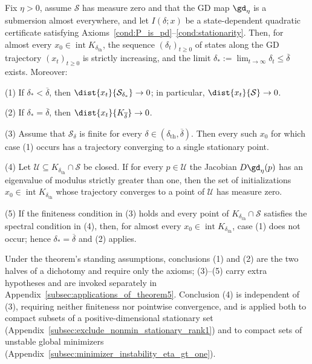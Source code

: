 \documentclass{article}
\begin{document}
\begin{theorem}\label{thm:abstract_state_dependent_convergence}
Fix $\eta>0$, assume $\mathcal S$ has measure zero and that the GD map
$\gd_\eta$ is a submersion almost everywhere, and let $I(\delta;x)$ be a
state-dependent quadratic certificate satisfying
Axioms~\ref{cond:P_is_pd}--\ref{cond:stationarity}.
Then, for almost every $x_0\in\operatorname{int}K_{\delta_{\mathrm{th}}}$,
the sequence $(\delta_t)_{t\ge0}$ of states along the GD trajectory $(x_t)_{t\ge0}$
is strictly increasing, and the limit
$\delta_\ast:=\lim_{t\to\infty}\delta_t\le\overline\delta$ exists.
Moreover:

(1) If $\delta_\ast<\overline\delta$, then
$\dist{x_t}{\mathcal S_{\delta_\ast}}\to0$; in particular,
$\dist{x_t}{\mathcal S}\to0$.

(2) If $\delta_\ast=\overline\delta$, then $\dist{x_t}{K_{\overline\delta}}\to 0$.

(3) Assume that $\mathcal S_\delta$ is finite for every
$\delta\in(\delta_{\mathrm{th}},\overline\delta)$. Then every such $x_0$ for
which case (1) occurs has a trajectory converging to a single stationary point.

(4) Let $\mathcal U\subseteq K_{\delta_{\mathrm{th}}}\cap\mathcal S$ be
closed. If for every $p\in\mathcal U$ the Jacobian $D\gd_\eta(p)$ has an
eigenvalue of modulus strictly greater than one, then the set of
initializations $x_0\in\operatorname{int}K_{\delta_{\mathrm{th}}}$ whose
trajectory converges to a point of $\mathcal U$ has measure zero.

(5) If the finiteness condition in (3) holds and every point of
$K_{\delta_{\mathrm{th}}}\cap\mathcal S$ satisfies the spectral condition in
(4), then, for almost every
$x_0\in\operatorname{int}K_{\delta_{\mathrm{th}}}$, case (1) does not occur;
hence $\delta_\ast=\overline\delta$ and (2) applies.
\end{theorem}

Under the theorem's standing assumptions, conclusions (1) and (2) are the two
halves of a dichotomy and require only the axioms; (3)--(5) carry extra
hypotheses and are invoked separately in
Appendix~\ref{subsec:applications_of_theorem5}. Conclusion (4) is independent
of (3), requiring neither finiteness nor pointwise convergence, and is applied
both to compact subsets of a positive-dimensional stationary set
(Appendix~\ref{subsec:exclude_nonmin_stationary_rank1}) and to compact sets of
unstable global minimizers
(Appendix~\ref{subsec:minimizer_instability_eta_gt_one}).
\end{document}
